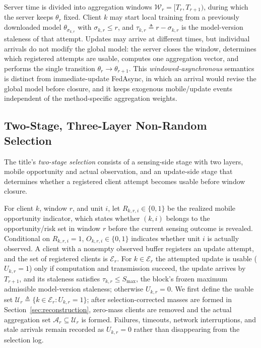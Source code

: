 \documentclass[letterpaper,journal]{IEEEtran}
\begin{document}
Server time is divided into aggregation windows
$\mathcal{W}_r=[T_r,T_{r+1})$, during which the server keeps $\theta_r$ fixed.
Client $k$ may start local training from a previously downloaded model
$\theta_{\sigma_{k,r}}$ with $\sigma_{k,r}\le r$, and
$\tau_{k,r}\triangleq r-\sigma_{k,r}$ is the model-version staleness of that
attempt.  Updates may arrive at different times, but individual arrivals do not
modify the global model: the server closes the window, determines which
registered attempts are usable, computes one aggregation vector, and performs the
single transition $\theta_r\rightarrow\theta_{r+1}$.  This
\emph{windowed-asynchronous} semantics is distinct from immediate-update
FedAsync, in which an arrival would revise the global model before closure, and
it keeps exogenous mobile/update events independent of the method-specific
aggregation weights.

\subsection{Two-Stage, Three-Layer Non-Random Selection}
\label{subsec:selection_process}

The title's \emph{two-stage selection} consists of a sensing-side stage with two
layers, mobile opportunity and actual observation, and an update-side stage that
determines whether a registered client attempt becomes usable before window
closure.

For client $k$, window $r$, and unit $i$, let
$R_{k,r,i}\in\{0,1\}$ be the realized mobile opportunity indicator, which states
whether $(k,i)$ belongs to the opportunity/risk set in window $r$ before the
current sensing outcome is revealed.  Conditional on $R_{k,r,i}=1$,
$O_{k,r,i}\in\{0,1\}$ indicates whether unit $i$ is actually observed.  A client
with a nonempty observed buffer registers an update attempt, and the set of
registered clients is $\mathcal{E}_r$.  For $k\in\mathcal{E}_r$ the attempted
update is usable ($U_{k,r}=1$) only if computation and transmission succeed, the
update arrives by $T_{r+1}$, and its staleness satisfies
$\tau_{k,r}\le S_{\max}$, the block's frozen maximum admissible model-version
staleness; otherwise $U_{k,r}=0$.  We first define the usable set
$\mathcal{U}_r\triangleq\{k\in\mathcal{E}_r:U_{k,r}=1\}$; after
selection-corrected masses are formed in Section~\ref{sec:reconstruction},
zero-mass clients are removed and the actual aggregation set
$\mathcal{A}_r\subseteq\mathcal{U}_r$ is formed.  Failures, timeouts, network
interruptions, and stale arrivals remain recorded as $U_{k,r}=0$ rather than
disappearing from the selection log.
\end{document}
